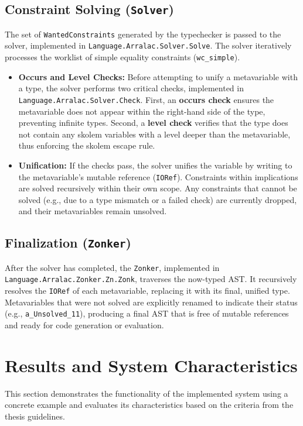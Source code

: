 \subsection{Constraint Solving (\texttt{Solver})}
The set of \texttt{WantedConstraints} generated by the typechecker is passed to the solver, implemented in \texttt{Language.Arralac.Solver.Solve}. The solver iteratively processes the worklist of simple equality constraints (\texttt{wc\_simple}).
\begin{itemize}
  \item \textbf{Occurs and Level Checks:} Before attempting to unify a metavariable with a type, the solver performs two critical checks, implemented in \texttt{Language.Arralac.Solver.Check}. First, an \textbf{occurs check} ensures the metavariable does not appear within the right-hand side of the type, preventing infinite types. Second, a \textbf{level check} verifies that the type does not contain any skolem variables with a level deeper than the metavariable, thus enforcing the skolem escape rule.
  \item \textbf{Unification:} If the checks pass, the solver unifies the variable by writing to the metavariable's mutable reference (\texttt{IORef}). Constraints within implications are solved recursively within their own scope. Any constraints that cannot be solved (e.g., due to a type mismatch or a failed check) are currently dropped, and their metavariables remain unsolved.
\end{itemize}

\subsection{Finalization (\texttt{Zonker})}
After the solver has completed, the \texttt{Zonker}, implemented in \texttt{Language.Arralac.Zonker.Zn.Zonk}, traverses the now-typed AST. It recursively resolves the \texttt{IORef} of each metavariable, replacing it with its final, unified type. Metavariables that were not solved are explicitly renamed to indicate their status (e.g., \texttt{a_Unsolved_11}), producing a final AST that is free of mutable references and ready for code generation or evaluation.

\section{Results and System Characteristics}
\label{sec:Implementation:Results}

This section demonstrates the functionality of the implemented system using a concrete example and evaluates its characteristics based on the criteria from the thesis guidelines.

